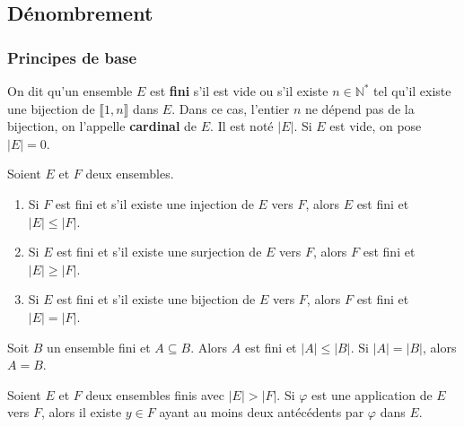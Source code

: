 




  \subsection{Dénombrement}

  \subsubsection{Principes de base}


  \begin{definition}
    On dit qu'un ensemble $E$ est \textbf{fini} s'il est vide ou s'il existe $n \in \mathbb{N}^*$ tel qu'il existe une bijection de $\llbracket 1, n \rrbracket$ dans $E$. Dans ce cas, l'entier $n$ ne dépend pas de la bijection, on l'appelle \textbf{cardinal} de $E$. Il est noté $\vert E \vert$. Si $E$ est vide, on pose $\vert E \vert = 0$.
  \end{definition}

  \begin{proposition}
    Soient $E$ et $F$ deux ensembles.
    \begin{enumerate}[label={\bfseries(\roman*)}]
      \item Si $F$ est fini et s'il existe une injection de $E$ vers $F$, alors $E$ est fini et $\vert E \vert \leq \vert F \vert$.
      \item Si $E$ est fini et s'il existe une surjection de $E$ vers $F$, alors $F$ est fini et $\vert E \vert \geq \vert F \vert$.
      \item Si $E$ est fini et s'il existe une bijection de $E$ vers $F$, alors $F$ est fini et $\vert E \vert = \vert F \vert$.
    \end{enumerate}
  \end{proposition}

  \begin{corollary}
    Soit $B$ un ensemble fini et $A \subseteq B$. Alors $A$ est fini et $\vert A \vert \leq \vert B \vert$. Si $\vert A \vert = \vert B \vert$, alors $A = B$.
  \end{corollary}

  \begin{corollary}
    Soient $E$ et $F$ deux ensembles finis avec $\vert E \vert > \vert F \vert$. Si $\varphi$ est une application de $E$ vers $F$, alors il existe $y \in F$ ayant au moins deux antécédents par $\varphi$ dans $E$.
  \end{corollary}


